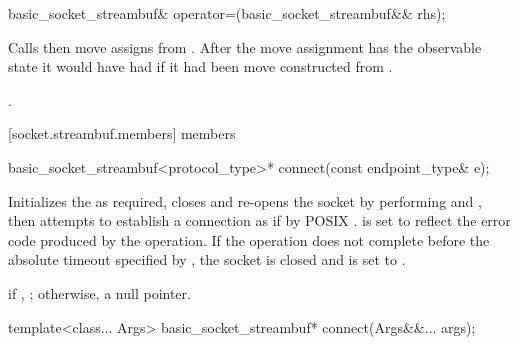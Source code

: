 \begin{itemdecl}
basic_socket_streambuf& operator=(basic_socket_streambuf&& rhs);
\end{itemdecl}

\begin{itemdescr}
\pnum
\effects Calls  then move assigns from . After the move assignment  has the observable state it would have had if it had been move constructed from .

\pnum
\returns {}.
\end{itemdescr}



[socket.streambuf.members]{ members}

\begin{itemdecl}
basic_socket_streambuf<protocol_type>* connect(const endpoint_type& e);
\end{itemdecl}

\begin{itemdescr}
\pnum
\effects Initializes the  as required, closes and re-opens the socket by performing  and , then attempts to establish a connection as if by POSIX .  is set to reflect the error code produced by the operation. If the operation does not complete before the absolute timeout specified by , the socket is closed and  is set to .

\pnum
\returns if , ; otherwise, a null pointer.
\end{itemdescr}

\begin{itemdecl}
template<class... Args>
  basic_socket_streambuf* connect(Args&&... args);
\end{itemdecl}

